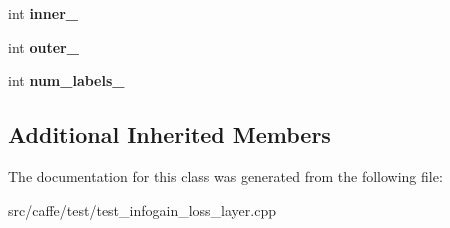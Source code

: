 \begin{DoxyCompactItemize}
\item 
\mbox{\label{classcaffe_1_1_infogain_loss_layer_test_a95bf771a13e37ac320fc9ddde394ac9e}} 
int {\bfseries inner\+\_\+}
\item 
\mbox{\label{classcaffe_1_1_infogain_loss_layer_test_a20dbb766b5ba6b5b9b8242cb0e0c7b1d}} 
int {\bfseries outer\+\_\+}
\item 
\mbox{\label{classcaffe_1_1_infogain_loss_layer_test_af0c3bb1a5ea582b3bf880c281eea388b}} 
int {\bfseries num\+\_\+labels\+\_\+}
\end{DoxyCompactItemize}
\subsection*{Additional Inherited Members}


The documentation for this class was generated from the following file\+:\begin{DoxyCompactItemize}
\item 
src/caffe/test/test\+\_\+infogain\+\_\+loss\+\_\+layer.\+cpp\end{DoxyCompactItemize}
